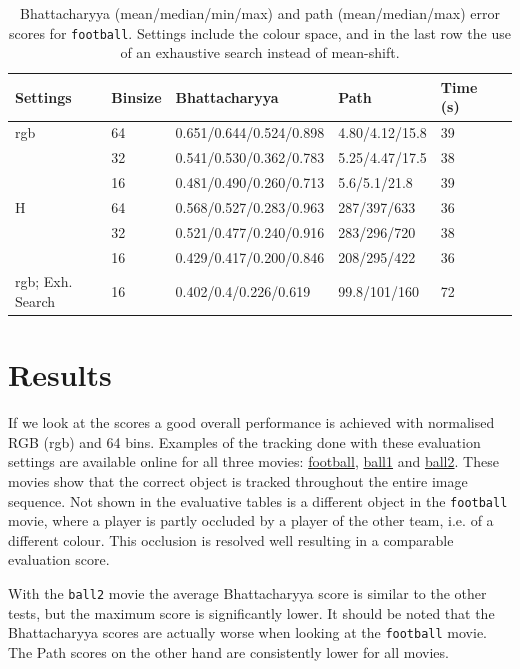 \documentclass[a4paper,11pt]{article}
\begin{document}
\begin{table}
  \centering
  \small
  \begin{tabular}{|l|l||l|l|l|l|}
    \hline
    Settings  & Binsize & Bhattacharyya & Path & Time (s)\\
    \hline
    rgb       &  64    & 0.651/0.644/0.524/0.898 & 4.80/4.12/15.8  & 39\\
              &  32    & 0.541/0.530/0.362/0.783 & 5.25/4.47/17.5 & 38\\
              &  16    & 0.481/0.490/0.260/0.713 & 5.6/5.1/21.8 & 39\\
    \hline
    H         &  64    & 0.568/0.527/0.283/0.963 & 287/397/633 & 36\\
              &  32    & 0.521/0.477/0.240/0.916 & 283/296/720 & 38\\
              &  16    & 0.429/0.417/0.200/0.846 & 208/295/422 & 36\\
    \hline
    rgb; Exh. Search & 16 & 0.402/0.4/0.226/0.619 & 99.8/101/160 & 72\\
    \hline
  \end{tabular}
  \caption{Bhattacharyya (mean/median/min/max) and path (mean/median/max) error scores for \texttt{football}. Settings include the colour space, and in the last row the use of an exhaustive search instead of mean-shift.}
  \label{tab:error:football}
\end{table}


\section{Results}
\label{sec:results}
If we look at the scores a good overall performance is achieved with normalised RGB (rgb) and 64 bins.
Examples of the tracking done with these evaluation settings are available online for all three movies: \href{http://www.youtube.com/watch?v=Rdj2X9cl9d8}{football}, \href{http://www.youtube.com/watch?v=bXcCzgcYsHU}{ball1} and \href{http://www.youtube.com/watch?v=39qQH3T52Nc}{ball2}.
These movies show that the correct object is tracked throughout the entire image sequence.
Not shown in the evaluative tables is a different object in the \texttt{football} movie, where a player is partly occluded by a player of the other team, i.e. of a different colour.
This occlusion is resolved well resulting in a comparable evaluation score.

With the \texttt{ball2} movie the average Bhattacharyya score is similar to the other tests, but the maximum score is significantly lower.
It should be noted that the Bhattacharyya scores are actually worse when looking at the \texttt{football} movie.
The Path scores on the other hand are consistently lower for all movies.
\end{document}
